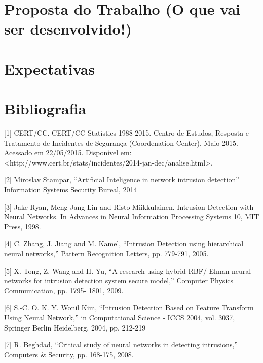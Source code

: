 \documentclass[
	12pt,				%
	openright,			%
	oneside,
	a4paper,			%
	english,			%
	french,				%
	spanish,			%
	brazil				%
	]{abntex2}
\begin{document}
\chapter[Proposta do Trabalho]{Proposta do Trabalho (O que vai ser desenvolvido!)}


\chapter[Expectativas]{Expectativas}



\postextual

\chapter[Bibliografia]{Bibliografia}

%

[1] CERT/CC. CERT/CC Statistics 1988-2015. Centro de Estudos, Resposta e Tratamento de Incidentes de Segurança  (Coordenation Center), Maio 2015. Acessado em 22/05/2015. Disponível
em: <http://www.cert.br/stats/incidentes/2014-jan-dec/analise.html>.

[2] Miroslav Stampar, “Artificial Inteligence in network intrusion detection” Information Systems Security Bureal, 2014

[3] Jake Ryan, Meng-Jang Lin and Risto Miikkulainen. Intrusion Detection with Neural
Networks. In Advances in Neural Information Processing Systems 10, MIT Press, 1998.


[4] C. Zhang, J. Jiang and M. Kamel, “Intrusion
Detection using hierarchical neural
networks,” Pattern Recognition Letters, pp.
779-791, 2005.

[5] X. Tong, Z. Wang and H. Yu, “A research
using hybrid RBF/ Elman neural networks for
intrusion detection system secure model,”
Computer Physics Communication, pp. 1795-
1801, 2009.

[6] S.-C. O. K. Y. Wonil Kim, “Intrusion
Detection Based on Feature Transform Using
Neural Network,” in Computational Science -
ICCS 2004, vol. 3037, Springer Berlin
Heidelberg, 2004, pp. 212-219

[7] R. Beghdad, “Critical study of neural networks in detecting intrusions,” Computers \& Security, pp. 168-175, 2008.


\end{document}
